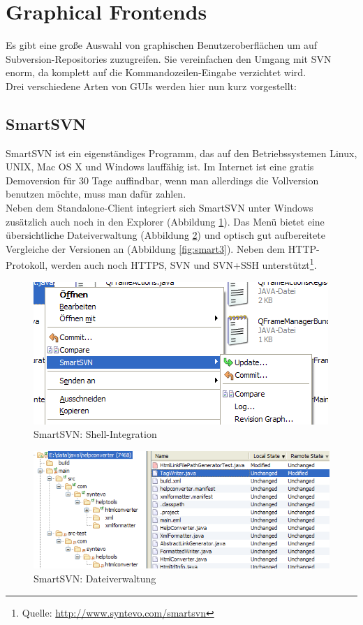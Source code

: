 \section{Graphical Frontends}
Es gibt eine große Auswahl von graphischen Benutzeroberflächen um auf Subversion-Repositories zuzugreifen. Sie vereinfachen den Umgang mit SVN enorm, da komplett auf die Kommandozeilen-Eingabe verzichtet wird.\\
Drei verschiedene Arten von GUIs werden hier nun kurz vorgestellt:
\subsection{SmartSVN}
SmartSVN ist ein eigenständiges Programm, das auf den Betriebssystemen Linux, UNIX, Mac OS X und Windows lauffähig ist. Im Internet ist eine gratis Demoversion für 30 Tage auffindbar, wenn man allerdings die Vollversion benutzen möchte, muss man dafür zahlen.\\
Neben dem Standalone-Client integriert sich SmartSVN unter Windows zusätzlich auch noch in den Explorer (Abbildung \ref{fig:smart1}). Das Menü bietet eine übersichtliche Dateiverwaltung (Abbildung \ref{fig:smart2}) und optisch gut aufbereitete Vergleiche der Versionen an (Abbildung \ref{fig:smart3}).
Neben dem HTTP-Protokoll, werden auch noch HTTPS, SVN und SVN+SSH unterstützt\footnote{Quelle: \url{http://www.syntevo.com/smartsvn}}.
\begin{figure}[!htb]
        \centering
        \includegraphics[width=.8\textwidth]{1_smartsvn1.png}
        \caption{SmartSVN: Shell-Integration}
        \label{fig:smart1}
\end{figure}
\begin{figure}[!htb]
        \centering
        \includegraphics[width=.9\textwidth]{2_smartsvn2.png}
        \caption{SmartSVN: Dateiverwaltung}
        \label{fig:smart2}
\end{figure}
